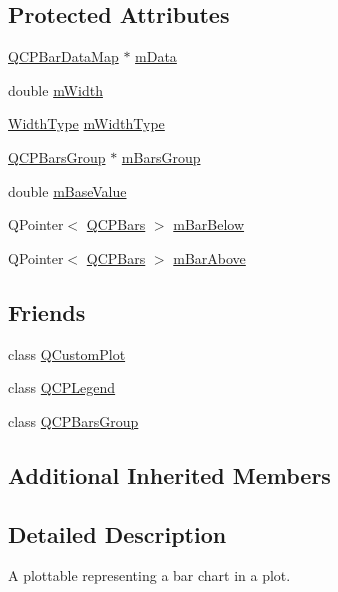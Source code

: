 \subsection*{Protected Attributes}
\begin{DoxyCompactItemize}
\item 
\hyperlink{qcustomplot_8h_aa846c77472cae93def9f1609d0c57191}{Q\+C\+P\+Bar\+Data\+Map} $\ast$ \hyperlink{class_q_c_p_bars_aef28d29d51ef84b608ecd22c55d531ff}{m\+Data}
\item 
double \hyperlink{class_q_c_p_bars_a7c4e0f2246f8133f48a9c3f24cf5b920}{m\+Width}
\item 
\hyperlink{class_q_c_p_bars_a65dbbf1ab41cbe993d71521096ed4649}{Width\+Type} \hyperlink{class_q_c_p_bars_a94dba1309496c7601d01e2c59715cbb3}{m\+Width\+Type}
\item 
\hyperlink{class_q_c_p_bars_group}{Q\+C\+P\+Bars\+Group} $\ast$ \hyperlink{class_q_c_p_bars_a9f59c255f3739182ca9744dff75beaa9}{m\+Bars\+Group}
\item 
double \hyperlink{class_q_c_p_bars_aa0515cf47fa6044cc28e59b1ae5ec759}{m\+Base\+Value}
\item 
Q\+Pointer$<$ \hyperlink{class_q_c_p_bars}{Q\+C\+P\+Bars} $>$ \hyperlink{class_q_c_p_bars_ad51db970eed7e286f2753b0216fc56de}{m\+Bar\+Below}
\item 
Q\+Pointer$<$ \hyperlink{class_q_c_p_bars}{Q\+C\+P\+Bars} $>$ \hyperlink{class_q_c_p_bars_a0c1c46076c41a478dbb373cfd35929aa}{m\+Bar\+Above}
\end{DoxyCompactItemize}
\subsection*{Friends}
\begin{DoxyCompactItemize}
\item 
class \hyperlink{class_q_c_p_bars_a1cdf9df76adcfae45261690aa0ca2198}{Q\+Custom\+Plot}
\item 
class \hyperlink{class_q_c_p_bars_a8429035e7adfbd7f05805a6530ad5e3b}{Q\+C\+P\+Legend}
\item 
class \hyperlink{class_q_c_p_bars_ae1051b4d58a2786cb420367a586e2fee}{Q\+C\+P\+Bars\+Group}
\end{DoxyCompactItemize}
\subsection*{Additional Inherited Members}


\subsection{Detailed Description}
A plottable representing a bar chart in a plot. 



